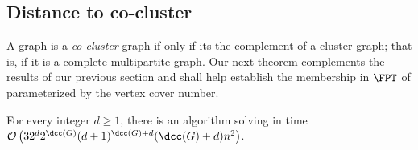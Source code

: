 \subsection{Distance to co-cluster}
\label{sec:cocluster}

A graph is a \emph{co-cluster} graph if only if its the complement of a cluster graph; that is, if it is a complete multipartite graph.
Our next theorem complements the results of our previous section and shall help establish the membership  in $\FPT$ of  parameterized by the vertex cover number.

\begin{theorem}
    \label{thm:fpt_cocluster}
    For every integer $d \geq 1$, there is an algorithm solving  in time $\bigO{32^d2^{\dcc(G)}(d+1)^{\dcc(G)+d}(\dcc(G)+d)n^2}$.
\end{theorem}

